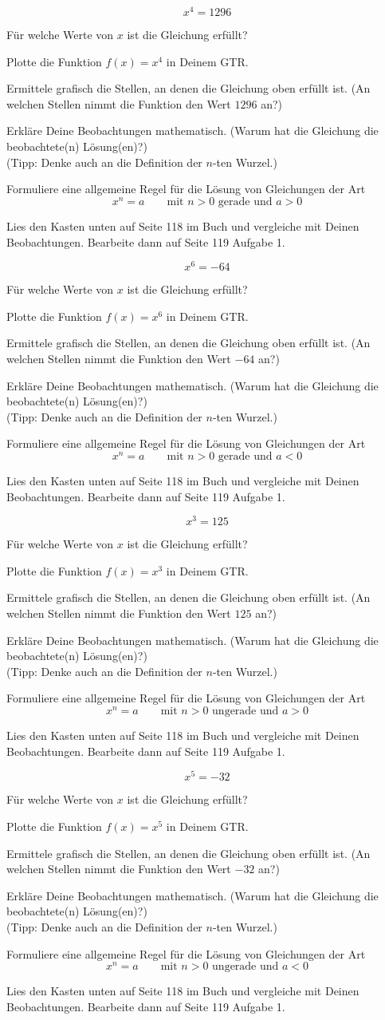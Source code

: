 \documentclass[11pt, a5paper]{arbeitsblatt}
\newcommand{\arbeitsauftrag}[4]{%
\ReiheTitel
{\Large\[ #1 = #2 \]}

{\large Für welche Werte von $x$ ist die Gleichung erfüllt?}

\begin{enuma}
	\item Plotte die Funktion $f(x) = #1$ in Deinem GTR.
	\item Ermittele grafisch die Stellen, an denen die Gleichung oben erfüllt ist. (An welchen Stellen nimmt die Funktion den Wert $#2$ an?)
	\item Erkläre Deine Beobachtungen mathematisch. (Warum hat die Gleichung die beobachtete(n) Lösung(en)?)\\
	(Tipp: Denke auch an die Definition der $n$-ten Wurzel.)
	\item Formuliere eine allgemeine Regel für die Lösung von Gleichungen der Art \[ x^n = a \qquad \text{mit }n > 0 \text{ #3 und }a #4 0\]
	\item Lies den Kasten unten auf Seite 118 im Buch und vergleiche mit Deinen Beobachtungen. Bearbeite dann auf Seite 119 Aufgabe 1.
\end{enuma}
}
\begin{document}
\arbeitsauftrag{x^4}{1296}{gerade}{>}\clearpage
\arbeitsauftrag{x^6}{-64}{gerade}{<}\clearpage
\arbeitsauftrag{x^3}{125}{ungerade}{>}\clearpage
\arbeitsauftrag{x^5}{-32}{ungerade}{<}\clearpage
\end{document}
